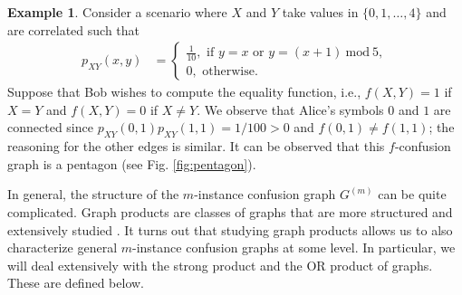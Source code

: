 \documentclass[journal, onecolumn, draftcls]{IEEEtran}
\theoremstyle{definition}
\newtheorem{example}{Example}
\newcommand{\Mod}[1]{\ \mathrm{mod}\ #1}
\newcommand{\aditya}[1]{\marginpar{+}{\bf Aditya's remark}: {\em #1}}
\begin{document}
\begin{example}
Consider a scenario where  $X$ and $Y$ take values in $\{0, 1, \dots, 4\}$ and are correlated such that 
    \begin{align}
       p_{XY}(x,y)  &= \begin{cases}
            \frac{1}{10}, \text{~if~} y=x\text{~or~}y=(x+1)\Mod 5,\\
            0,\text{~otherwise.}
        \end{cases} \label{eq:corr_prop_eq}
    \end{align}
Suppose that Bob wishes to compute the equality function, i.e., $f(X,Y) = 1$ if $X=Y$ and $f(X,Y) =0$ if $X\ne Y$. We observe that Alice's symbols $0$ and $1$ are connected since $p_{XY}(0,1) p_{XY}(1,1) = 1/100 > 0$ and $f(0,1) \neq f(1,1)$; the reasoning for the other edges is similar. It can be observed that this $f$-confusion graph is a pentagon (see Fig. \ref{fig:pentagon}).   
\end{example}

In general, the structure of the $m$-instance confusion graph $G^{(m)}$ can be quite complicated. Graph products are classes of graphs that are more structured and extensively studied \cite{HammackGraphProduct}. It turns out that studying graph products allows us to also characterize general $m$-instance confusion graphs at some level.
In particular, we will deal extensively with the strong product and the OR product of graphs. These are defined below.
%
%
\end{document}
